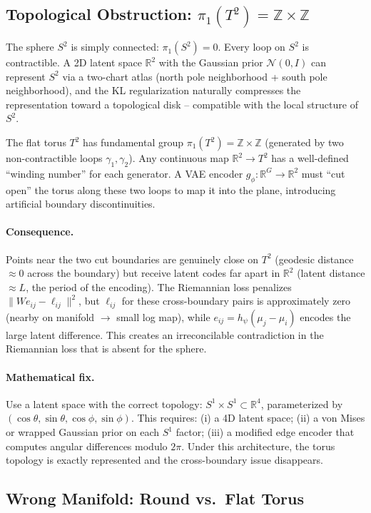 \documentclass[11pt]{article}
\newcommand{\R}{\mathbb{R}}
\newcommand{\Z}{\mathbb{Z}}
\begin{document}
\subsection{Topological Obstruction: $\pi_1(T^2) = \Z \times \Z$}

The sphere $S^2$ is simply connected: $\pi_1(S^2) = 0$. Every loop on $S^2$
is contractible. A 2D latent space $\R^2$ with the Gaussian prior $\mathcal{N}(0,I)$
can represent $S^2$ via a two-chart atlas (north pole neighborhood + south pole
neighborhood), and the KL regularization naturally compresses the representation
toward a topological disk -- compatible with the local structure of $S^2$.

The flat torus $T^2$ has fundamental group $\pi_1(T^2) = \Z \times \Z$
(generated by two non-contractible loops $\gamma_1, \gamma_2$). Any continuous
map $\R^2 \to T^2$ has a well-defined ``winding number'' for each generator.
A VAE encoder $g_\phi: \R^G \to \R^2$ must ``cut open'' the torus along these
two loops to map it into the plane, introducing artificial boundary discontinuities.

\paragraph{Consequence.}
Points near the two cut boundaries are genuinely close on $T^2$ (geodesic distance
$\approx 0$ across the boundary) but receive latent codes far apart in $\R^2$
(latent distance $\approx L$, the period of the encoding). The Riemannian loss
penalizes $\|W e_{ij} - \ell_{ij}\|^2$, but $\ell_{ij}$ for these cross-boundary
pairs is approximately zero (nearby on manifold $\to$ small log map), while
$e_{ij} = h_\psi(\mu_j - \mu_i)$ encodes the large latent difference. This
creates an irreconcilable contradiction in the Riemannian loss that is absent
for the sphere.

\paragraph{Mathematical fix.}
Use a latent space with the correct topology: $S^1 \times S^1 \subset \R^4$,
parameterized by $(\cos\theta, \sin\theta, \cos\phi, \sin\phi)$. This requires:
(i) a 4D latent space; (ii) a von Mises or wrapped Gaussian prior on each $S^1$
factor; (iii) a modified edge encoder that computes angular differences modulo
$2\pi$. Under this architecture, the torus topology is exactly represented and
the cross-boundary issue disappears.

\subsection{Wrong Manifold: Round vs.\ Flat Torus}
\end{document}
